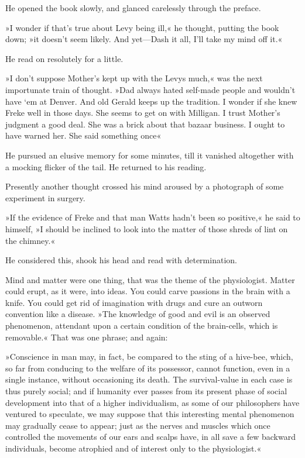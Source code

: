 He opened the book slowly, and glanced carelessly through the preface.

»I wonder if that's true about Levy being ill,« he thought, putting the book down; »it doesn't seem likely. And yet—Dash it all, I'll take my mind off it.«

He read on resolutely for a little.

»I don't suppose Mother's kept up with the Levys much,« was the next importunate train of thought. »Dad always hated self-made people and wouldn't have `em at Denver. And old Gerald keeps up the tradition. I wonder if she knew Freke well in those days. She seems to get on with Milligan. I trust Mother's judgment a good deal. She was a brick about that bazaar business. I ought to have warned her. She said something once\longdash«

He pursued an elusive memory for some minutes, till it vanished altogether with a mocking flicker of the tail. He returned to his reading.

Presently another thought crossed his mind aroused by a photograph of some experiment in surgery.

»If the evidence of Freke and that man Watts hadn't been so positive,« he said to himself, »I should be inclined to look into the matter of those shreds of lint on the chimney.«

He considered this, shook his head and read with determination.

Mind and matter were one thing, that was the theme of the physiologist. Matter could erupt, as it were, into ideas. You could carve passions in the brain with a knife. You could get rid of imagination with drugs and cure an outworn convention like a disease. »The knowledge of good and evil is an observed phenomenon, attendant upon a certain condition of the brain-cells, which is removable.« That was one phrase; and again:

»Conscience in man may, in fact, be compared to the sting of a hive-bee, which, so far from conducing to the welfare of its possessor, cannot function, even in a single instance, without occasioning its death. The survival-value in each case is thus purely social; and if humanity ever passes from its present phase of social development into that of a higher individualism, as some of our philosophers have ventured to speculate, we may suppose that this interesting mental phenomenon may gradually cease to appear; just as the nerves and muscles which once controlled the movements of our ears and scalps have, in all save a few backward individuals, become atrophied and of interest only to the physiologist.«

